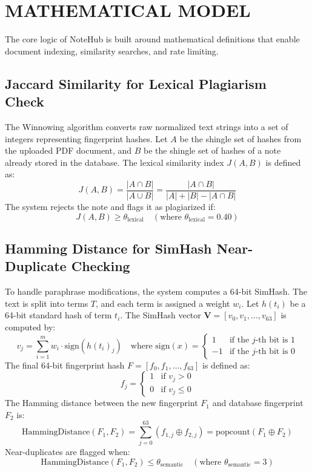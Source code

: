 \documentclass[12,Times new Roman,a4paper]{report}
\begin{document}
\section{MATHEMATICAL MODEL}
The core logic of NoteHub is built around mathematical definitions that enable document indexing, similarity searches, and rate limiting.

\subsection{Jaccard Similarity for Lexical Plagiarism Check}
The Winnowing algorithm converts raw normalized text strings into a set of integers representing fingerprint hashes. Let $A$ be the shingle set of hashes from the uploaded PDF document, and $B$ be the shingle set of hashes of a note already stored in the database. The lexical similarity index $J(A, B)$ is defined as:
\begin{equation}
J(A, B) = \frac{|A \cap B|}{|A \cup B|} = \frac{|A \cap B|}{|A| + |B| - |A \cap B|}
\end{equation}
The system rejects the note and flags it as plagiarized if:
\begin{equation}
J(A, B) \ge \theta_{\text{lexical}} \quad (\text{where } \theta_{\text{lexical}} = 0.40)
\end{equation}

\subsection{Hamming Distance for SimHash Near-Duplicate Checking}
To handle paraphrase modifications, the system computes a 64-bit SimHash. The text is split into terms $T$, and each term is assigned a weight $w_i$. Let $h(t_i)$ be a 64-bit standard hash of term $t_i$. The SimHash vector $\mathbf{V} = [v_0, v_1, \dots, v_{63}]$ is computed by:
\begin{equation}
v_j = \sum_{i=1}^{m} w_i \cdot \text{sign}(h(t_i)_j) \quad \text{where } \text{sign}(x) = \begin{cases} 1 & \text{if the } j\text{-th bit is } 1 \\ -1 & \text{if the } j\text{-th bit is } 0 \end{cases}
\end{equation}
The final 64-bit fingerprint hash $F = [f_0, f_1, \dots, f_{63}]$ is defined as:
\begin{equation}
f_j = \begin{cases} 1 & \text{if } v_j > 0 \\ 0 & \text{if } v_j \le 0 \end{cases}
\end{equation}
The Hamming distance between the new fingerprint $F_1$ and database fingerprint $F_2$ is:
\begin{equation}
\text{HammingDistance}(F_1, F_2) = \sum_{j=0}^{63} (f_{1,j} \oplus f_{2,j}) = \text{popcount}(F_1 \oplus F_2)
\end{equation}
Near-duplicates are flagged when:
\begin{equation}
\text{HammingDistance}(F_1, F_2) \le \theta_{\text{semantic}} \quad (\text{where } \theta_{\text{semantic}} = 3)
\end{equation}
\end{document}
